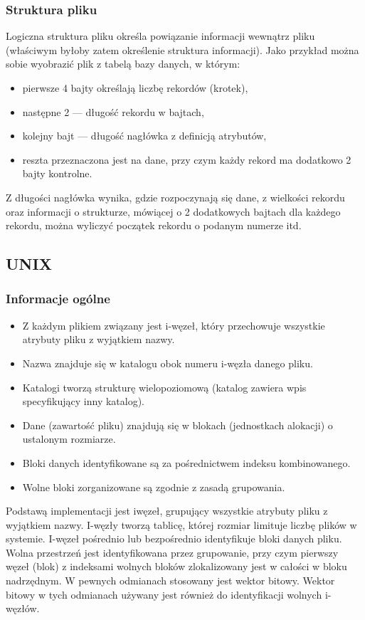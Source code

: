 \documentclass[12pt]{article}
\begin{document}
    \subsubsection{Struktura pliku}
    Logiczna struktura pliku określa powiązanie informacji wewnątrz pliku (właściwym byłoby zatem określenie struktura informacji).
    Jako przykład można sobie wyobrazić plik z tabelą bazy danych, w którym:
    \begin{itemize}
        \item pierwsze 4 bajty określają liczbę rekordów (krotek),
        \item następne 2 — długość rekordu w bajtach,
        \item kolejny bajt — długość nagłówka z definicją atrybutów,
        \item reszta przeznaczona jest na dane, przy czym każdy rekord ma dodatkowo 2 bajty kontrolne.
    \end{itemize}
    Z długości nagłówka wynika, gdzie rozpoczynają się dane, z wielkości rekordu oraz informacji o strukturze, mówiącej o 2
    dodatkowych bajtach dla każdego rekordu, można wyliczyć początek rekordu o podanym numerze itd.
    
    \subsection{UNIX}
    \subsubsection{Informacje ogólne}
    \begin{itemize}
        \item Z każdym plikiem związany jest i-węzeł, który przechowuje wszystkie atrybuty pliku z wyjątkiem nazwy.
        \item Nazwa znajduje się w katalogu obok numeru i-węzła danego pliku.
        \item Katalogi tworzą strukturę wielopoziomową (katalog zawiera wpis specyfikujący inny katalog).
        \item Dane (zawartość pliku) znajdują się w blokach (jednostkach alokacji) o ustalonym rozmiarze.
        \item Bloki danych identyfikowane są za pośrednictwem indeksu kombinowanego.
        \item Wolne bloki zorganizowane są zgodnie z zasadą grupowania.
    \end{itemize}
    
    Podstawą implementacji jest iwęzeł, grupujący wszystkie
    atrybuty pliku z wyjątkiem nazwy. I-węzły tworzą tablicę, której rozmiar limituje liczbę plików w systemie. I-węzeł pośrednio lub
    bezpośrednio identyfikuje bloki danych pliku. Wolna przestrzeń jest identyfikowana przez grupowanie, przy czym pierwszy węzeł
    (blok) z indeksami wolnych bloków zlokalizowany jest w całości w bloku nadrzędnym. W pewnych odmianach stosowany jest
    wektor bitowy. Wektor bitowy w tych odmianach używany jest również do identyfikacji wolnych i-węzłów.
    
\end{document}
